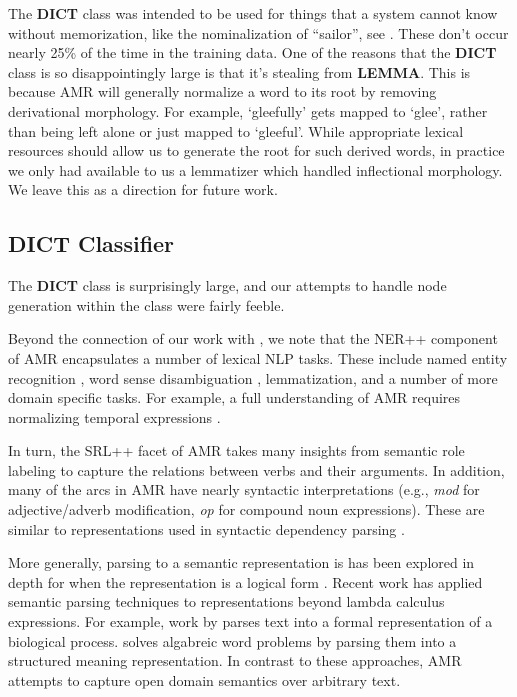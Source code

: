 \documentclass[11pt]{article}
\newcommand\e[1]{\textit{#1}} %
\begin{document}
The \textbf{DICT} class was intended to be used for things that a system cannot know without memorization, like the nominalization of ``sailor'', see . These don't occur nearly 25\% of the time in the training data. One of the reasons that the \textbf{DICT} class is so disappointingly large is that it's stealing from \textbf{LEMMA}. This is because AMR will generally normalize a word to its root by removing derivational morphology. For example, `gleefully' gets mapped to `glee', rather than being left alone or just mapped to `gleeful'. While appropriate lexical resources should allow us to generate the root for such derived words, in practice we only had available to us a lemmatizer which handled inflectional morphology. We leave this as a direction for future work.

\subsection{DICT Classifier}

The \textbf{DICT} class is surprisingly large, and our attempts to handle node generation within the class were fairly feeble.


Beyond the connection of our work with , we note that 
the NER++ component of AMR encapsulates a number of lexical NLP tasks.
These include named entity recognition \cite{2007nadeau-ner,stanford-ner},
  word sense disambiguation \cite{1995yarowsky-wsd,2002banerjee-wsd},
  lemmatization, and a number of more domain specific tasks.
For example, a full understanding of AMR requires normalizing temporal
  expressions \cite{2010verhagen-tempeval,2010strotgen-temporal,2012chang-temporal}.
 
In turn, the SRL++ facet of AMR takes many insights from semantic role labeling
  \cite{2002gildea-srl,2004punyakanok-srl,srikumar2013-srl} to capture the
  relations between verbs and their arguments.
In addition, many of the arcs in AMR have nearly syntactic interpretations
  (e.g., \e{mod} for adjective/adverb modification, \e{op} for compound noun
  expressions).
These are similar to representations used in syntactic dependency parsing
  \cite{stanford-dependencies,2005mcdonald-dependency0,2006buchholz-conll}.

More generally, parsing to a semantic representation is has been explored in
  depth for when the representation is a logical form
  \cite{2005kate-semantics,2005zettlemoyer-semantics,2011liang-semantics}.
Recent work has applied semantic parsing techniques to representations beyond
  lambda calculus expressions.
For example, work by  parses
  text into a formal representation of a biological process.
 solves algabreic word problems by parsing them
  into a structured meaning representation.
In contrast to these approaches, AMR attempts to capture open domain semantics
  over arbitrary text.
\end{document}
